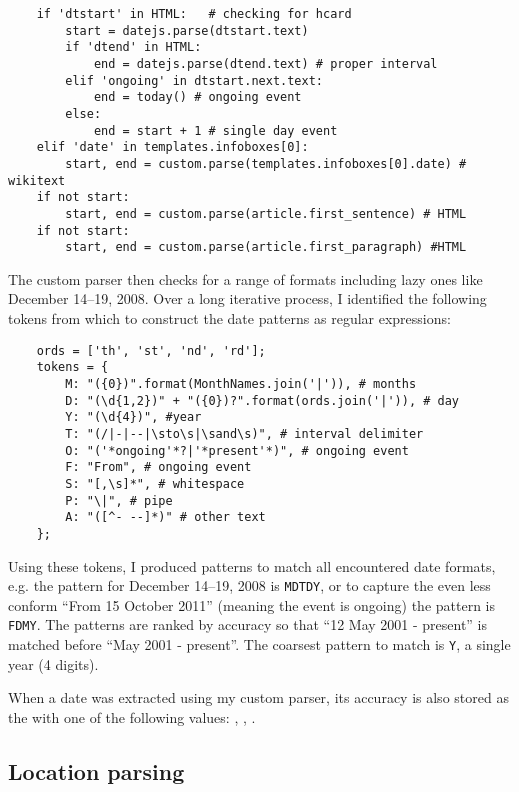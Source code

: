 \begin{lstlisting}
	if 'dtstart' in HTML:	# checking for hcard
		start = datejs.parse(dtstart.text)
		if 'dtend' in HTML:
			end = datejs.parse(dtend.text) # proper interval
		elif 'ongoing' in dtstart.next.text:
			end = today() # ongoing event
		else:
			end = start + 1 # single day event
	elif 'date' in templates.infoboxes[0]:
		start, end = custom.parse(templates.infoboxes[0].date) # wikitext
	if not start:
		start, end = custom.parse(article.first_sentence) # HTML
	if not start:
		start, end = custom.parse(article.first_paragraph) #HTML
\end{lstlisting}

The custom parser then checks for a range of formats including lazy ones like December 14--19, 2008.
Over a long iterative process, I identified the following tokens from which to construct the date patterns as regular expressions:

\begin{lstlisting}
	ords = ['th', 'st', 'nd', 'rd'];
	tokens = {
		M: "({0})".format(MonthNames.join('|')), # months
		D: "(\d{1,2})" + "({0})?".format(ords.join('|')), # day
		Y: "(\d{4})", #year
		T: "(/|-|--|\sto\s|\sand\s)", # interval delimiter
		O: "('*ongoing'*?|'*present'*)", # ongoing event
		F: "From", # ongoing event
		S: "[,\s]*", # whitespace
		P: "\|", # pipe
		A: "([^- --]*)" # other text
	};
\end{lstlisting}

Using these tokens, I produced patterns to match all encountered date formats, e.g. the pattern for December 14--19, 2008 is \verb"MDTDY", or to capture the even less conform ``From 15 October 2011'' (meaning the event is ongoing) the pattern is \verb"FDMY".
The patterns are ranked by accuracy so that ``12 May 2001 - present'' is matched before ``May 2001 - present''.
The coarsest pattern to match is \verb"Y", a single year (4 digits).

When a date was extracted using my custom parser, its accuracy is also stored as the  with one of the following values: , , .

\subsection{Location parsing}

